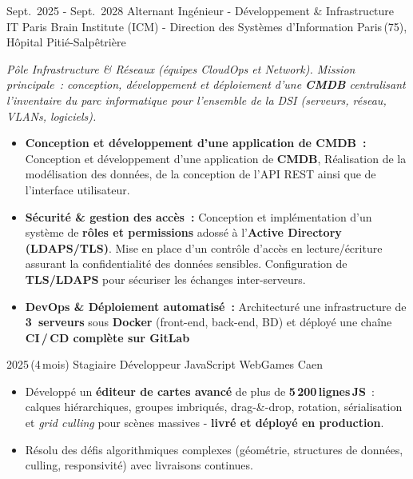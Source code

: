 \documentclass[11pt, a4paper]{moderncv}
\begin{document}
\cventry%
  {Sept.~2025 - Sept.~2028}%
  {Alternant Ingénieur - Développement \& Infrastructure IT}%
  {Paris Brain Institute (ICM) - Direction des Systèmes d'Information}%
  {Paris\,(75), Hôpital Pitié-Salpêtrière}%
  {}%
  {%
    \textit{Pôle Infrastructure \& Réseaux (équipes CloudOps et Network).
    Mission principale~: conception, développement et déploiement
    d'une \textbf{CMDB} centralisant l'inventaire du parc informatique
    pour l'ensemble de la DSI (serveurs, réseau, VLANs, logiciels).}%
    \smallskip
    \begin{itemize}
        \item \textbf{Conception et développement d’une application de CMDB~:}
        Conception et développement d’une application de \textbf{CMDB}, Réalisation de la modélisation des données, de la conception de l’API REST ainsi que de l’interface utilisateur.
    \item \textbf{Sécurité \& gestion des accès~:}
    Conception et implémentation d’un système de \textbf{rôles et permissions}
    adossé à l’\textbf{Active Directory (LDAPS/TLS)}. Mise en place d’un contrôle
    d’accès en lecture/écriture assurant la confidentialité des données sensibles.
    Configuration de \textbf{TLS/LDAPS} pour sécuriser les échanges inter-serveurs.
      \item \textbf{DevOps \& Déploiement automatisé~:}
            Architecturé une infrastructure de \textbf{3~serveurs} sous
            \textbf{Docker} (front-end, back-end, BD) et déployé une chaîne
            \textbf{CI\,/\,CD complète sur GitLab}
    \end{itemize}
  }

\cventry%
  {2025\,(4\,mois)}%
  {Stagiaire Développeur JavaScript}%
  {WebGames}%
  {Caen}%
  {}%
  {%
    \begin{itemize}
      \item Développé un \textbf{éditeur de cartes avancé} de plus de
            \textbf{5\,200\,lignes\,JS}~: calques hiérarchiques,
            groupes imbriqués, drag-\&-drop, rotation, sérialisation
            et \textit{grid culling} pour scènes massives -
            \textbf{livré et déployé en production}.
      \item Résolu des défis algorithmiques complexes
            (géométrie, structures de données, culling, responsivité)
            avec livraisons continues.
    \end{itemize}
  }
\end{document}
